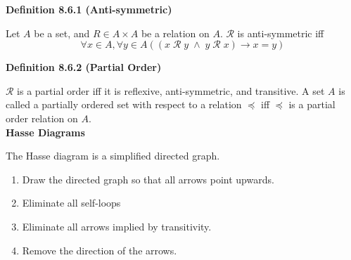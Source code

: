 \documentclass[a4paper]{article}
\makeatletter
\newcommand{\subheading}[1]{{\scriptsize\textbf{#1}}}
\def\tikzscale{1}\begin{lrbox}{\measure@tikzpicture}%
\edef\tikzscale{\pgfmathresult}%
\makeatother
\begin{document}
\begin{multicols*}{4}
\subheading{Definition 8.6.1 (Anti-symmetric)}

Let $A$ be a set, and $R \in A \times A$ be a relation on $A$. $\mathcal{R}$ is
anti-symmetric iff
$$\forall x \in A, \forall y \in A
  ((x\;\mathcal{R}\;y\;\land\;y\;\mathcal{R}\;x) \rightarrow x = y)$$

\subheading{Definition 8.6.2 (Partial Order)}

$\mathcal{R}$ is a partial order iff it is reflexive, anti-symmetric, and
transitive. A set $A$ is called a partially ordered set with respect to a
relation $\preceq$ iff $\preceq$ is a partial order relation on $A$.\\

\subheading{Hasse Diagrams}

The Hasse diagram is a simplified directed graph.
\begin{enumerate} \itemsep -0.5em
  \item Draw the directed graph so that all arrows point upwards.
  \item Eliminate all self-loops
  \item Eliminate all arrows implied by transitivity.
  \item Remove the direction of the arrows.
\end{enumerate}
\begin{center}
\begin{scaletikzpicturetowidth}{0.8\columnwidth}
\end{scaletikzpicturetowidth}
\end{center}


\end{multicols*}
\end{document}
